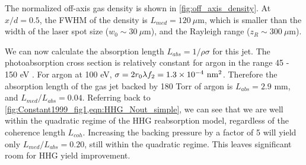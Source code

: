 The normalized off-axis gas density is shown in \cref{fig:off_axis_density}. At $x/d=0.5$, the FWHM of the density is $L_{med} = 120 \ \mu$m, which is smaller than the width of the laser spot size ($w_0 \sim 30 \ \mu$m), and the Rayleigh range ($z_R \sim 300 \ \mu$m).

We can now calculate the absorption length $L_{abs} = 1 / \rho \sigma$ for this jet. The photoabsorption cross section is relatively constant for argon in the range 45 - 150 eV \cite{gulliksonCXROXRayInteractions}. For argon at 100 eV, $\sigma = 2 r_0 \lambda f_2 = 1.3 \times 10^{-4} \textrm{ nm\textsuperscript{2}}$. Therefore the absorption length of the gas jet backed by 180 Torr of argon is $L_{abs} = 2.9 \textrm{ mm}$, and $L_{med}/L_{abs} = 0.04$. Referring back to \cref{fig:Constant1999_fig1,eqn:HHG_Nout_simple}, we can see that we are well within the quadratic regime of the HHG reabsorption model, regardless of the coherence length $L_{coh}$. Increasing the backing pressure by a factor of 5 will yield only $L_{med}/L_{abs} = 0.20$, still within the quadratic regime. This leaves significant room for HHG yield improvement.





